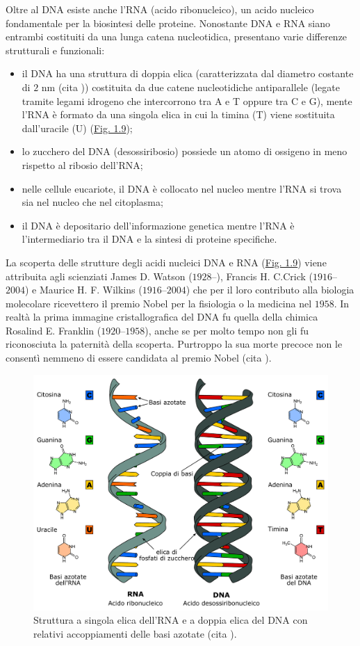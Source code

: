 \documentclass[12pt,a4paper,twoside]{report}
\begin{document}
	Oltre al DNA esiste anche l'RNA (acido ribonucleico), un acido nucleico fondamentale per la biosintesi delle proteine. Nonostante DNA e RNA siano entrambi costituiti da una lunga catena nucleotidica, presentano varie differenze strutturali e funzionali:
	\begin{itemize}
		\item il DNA ha una struttura di doppia elica (caratterizzata dal diametro costante di $2\mbox{ nm}$ (cita
		)) costituita da due catene nucleotidiche antiparallele (legate tramite legami idrogeno che intercorrono tra A e T oppure tra C e G), mente l'RNA è formato da una singola elica in cui la timina (T) viene sostituita dall'uracile (U) (\hyperref[fig:dna_structure]{Fig. 1.9});
		\item lo zucchero del DNA (desossiribosio) possiede un atomo di ossigeno in meno rispetto al ribosio dell'RNA;
		\item nelle cellule eucariote, il DNA è collocato nel nucleo mentre l'RNA si trova sia nel nucleo che nel citoplasma;
		\item il DNA è depositario dell'informazione genetica mentre l'RNA è l'intermediario tra il DNA e la sintesi di proteine specifiche.
	\end{itemize}
	La scoperta delle strutture degli acidi nucleici DNA e RNA (\hyperref[fig:dna_structure]{Fig. 1.9}) viene attribuita agli scienziati James D. Watson ($1928$--), Francis H. C.Crick ($1916$--$2004$) e Maurice H. F. Wilkins ($1916$--$2004$) che per il loro contributo alla biologia molecolare ricevettero il premio Nobel per la fisiologia o la medicina nel $1958$. In realtà la prima immagine cristallografica del DNA fu quella della chimica Rosalind E. Franklin ($1920$--$1958$), anche se per molto tempo non gli fu riconosciuta la paternità della scoperta. Purtroppo la sua morte precoce non le consentì nemmeno di essere candidata al premio Nobel (cita
	).
	
	\begin{figure}[H]
		\centering
		\includegraphics[width=0.9\linewidth]{dna_structure.pdf}
		\caption{Struttura a singola elica dell'RNA e a doppia elica del DNA con relativi accoppiamenti delle basi azotate (cita
		).}
		\label{fig:dna_structure}
	\end{figure}
	
\end{document}
